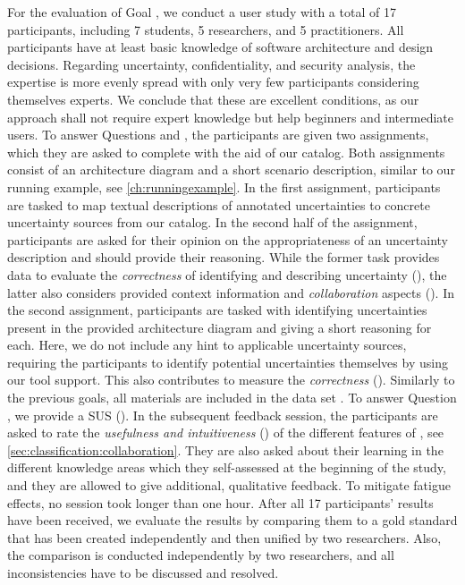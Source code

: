 For the evaluation of Goal , we conduct a user study with a total of 17 participants, including 7 students, 5 researchers, and 5 practitioners.
All participants have at least basic knowledge of software architecture and design decisions.
Regarding uncertainty, confidentiality, and security analysis, the expertise is more evenly spread with only very few participants considering themselves experts.
We conclude that these are excellent conditions, as our approach shall not require expert knowledge but help beginners and intermediate users.
To answer Questions  and , the participants are given two assignments, which they are asked to complete with the aid of our catalog.
Both assignments consist of an architecture diagram and a short scenario description, similar to our running example, see \autoref{ch:runningexample}.
In the first assignment, participants are tasked to map textual descriptions of annotated uncertainties to concrete uncertainty sources from our catalog.
In the second half of the assignment, participants are asked for their opinion on the appropriateness of an uncertainty description and should provide their reasoning.
While the former task provides data to evaluate the \emph{correctness} of identifying and describing uncertainty (), the latter also considers provided context information and \emph{collaboration} aspects ().
In the second assignment, participants are tasked with identifying uncertainties present in the provided architecture diagram and giving a short reasoning for each.
Here, we do not include any hint to applicable uncertainty sources, requiring the participants to identify potential uncertainties themselves by using our tool support.
This also contributes to measure the \emph{correctness} ().
Similarly to the previous goals, all materials are included in the data set \cite{dataset}.
To answer Question , we provide a \ac{SUS} ().
In the subsequent feedback session, the participants are asked to rate the \emph{usefulness and intuitiveness} () of the different features of \arcen, see \autoref{sec:classification:collaboration}.
They are also asked about their learning in the different knowledge areas which they self-assessed at the beginning of the study, and they are allowed to give additional, qualitative feedback.
To mitigate fatigue effects, no session took longer than one hour.
After all 17 participants' results have been received, we evaluate the results by comparing them to a gold standard that has been created independently and then unified by two researchers.
Also, the comparison is conducted independently by two researchers, and all inconsistencies have to be discussed and resolved.


